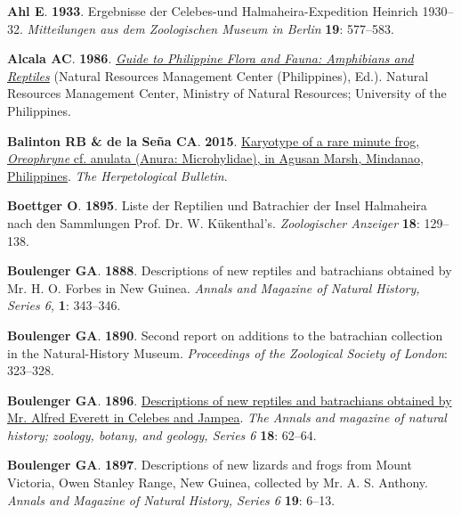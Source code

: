 \documentclass[
  letterpaper,
  DIV=11,
  numbers=noendperiod]{scrartcl}
\newlength{\cslhangindent}
\newenvironment{CSLReferences}[2] %
 {\begin{list}{}{%
  \setlength{\itemindent}{0pt}
  \setlength{\leftmargin}{0pt}
  \setlength{\parsep}{0pt}
  \ifodd #1
   \setlength{\leftmargin}{\cslhangindent}
   \setlength{\itemindent}{-1\cslhangindent}
  \fi
  \setlength{\itemsep}{#2\baselineskip}}}
 {\end{list}}
\begin{document}
\label{refs}
\begin{CSLReferences}{0}{1}
\textbf{\textbf{Ahl E}}. \textbf{1933}. {Ergebnisse der Celebes-und
Halmaheira-Expedition Heinrich 1930--32}. \emph{Mitteilungen aus dem
Zoologischen Museum in Berlin} \textbf{19}: 577--583.

\textbf{\textbf{Alcala AC}}. \textbf{1986}.
\emph{\href{https://books.google.com/books?id=QKMtAAAAMAAJ}{{Guide to
Philippine Flora and Fauna: Amphibians and Reptiles}}} (Natural
Resources Management Center (Philippines), Ed.). Natural Resources
Management Center, Ministry of Natural Resources; University of the
Philippines.

\textbf{\textbf{Balinton RB} \& \textbf{de la Seña CA}}. \textbf{2015}.
\href{https://api.semanticscholar.org/CorpusID:202544117}{{Karyotype of
a rare minute frog, \emph{Oreophryne} cf. anulata (Anura: Microhylidae),
in Agusan Marsh, Mindanao, Philippines}}. \emph{The Herpetological
Bulletin}.

\textbf{\textbf{Boettger O}}. \textbf{1895}. {Liste der Reptilien und
Batrachier der Insel Halmaheira nach den Sammlungen Prof. Dr. W.
K{ü}kenthal's}. \emph{Zoologischer Anzeiger} \textbf{18}: 129--138.

\textbf{\textbf{Boulenger GA}}. \textbf{1888}. {Descriptions of new
reptiles and batrachians obtained by Mr. H. O. Forbes in New Guinea}.
\emph{Annals and Magazine of Natural History, Series 6,} \textbf{1}:
343--346.

\textbf{\textbf{Boulenger GA}}. \textbf{1890}. {Second report on
additions to the batrachian collection in the Natural-History Museum}.
\emph{Proceedings of the Zoological Society of London}: 323--328.

\textbf{\textbf{Boulenger GA}}. \textbf{1896}.
\href{https://www.biodiversitylibrary.org/item/53362}{{Descriptions of
new reptiles and batrachians obtained by Mr. Alfred Everett in Celebes
and Jampea}}. \emph{The Annals and magazine of natural history; zoology,
botany, and geology, Series 6} \textbf{18}: 62--64.

\textbf{\textbf{Boulenger GA}}. \textbf{1897}. {Descriptions of new
lizards and frogs from Mount Victoria, Owen Stanley Range, New Guinea,
collected by Mr. A. S. Anthony}. \emph{Annals and Magazine of Natural
History, Series 6} \textbf{19}: 6--13.


\end{CSLReferences}
\end{document}
